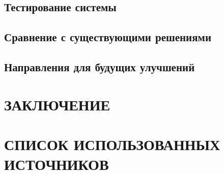 \documentclass[14pt]{article}
\begin{document}
\subsection{Тестирование системы}
\subsection{Сравнение с существующими решениями}
\subsection{Направления для будущих улучшений}

\newpage
\section*{ЗАКЛЮЧЕНИЕ}  %

\section*{СПИСОК ИСПОЛЬЗОВАННЫХ ИСТОЧНИКОВ}  %
\end{document}
